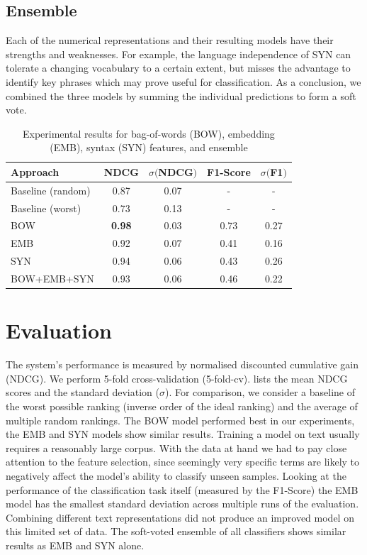 \subsection{Ensemble}
Each of the numerical representations and their resulting models have their strengths and weaknesses.
For example, the language independence of SYN can tolerate a changing vocabulary to a certain extent, but misses the advantage to identify key phrases which may prove useful for classification.
As a conclusion, we combined the three models by summing the individual predictions to form a soft vote.
\begin{table}[tb]
	\caption{Experimental results for bag-of-words (BOW), embedding (EMB), syntax (SYN) features, and ensemble}
	\label{tab:results}
	\begin{tabular}{lcccc}
		\toprule
		Approach & NDCG & $\sigma ($NDCG$)$ & F1-Score &  $\sigma ($F1$)$\\
		\midrule
		Baseline (random) & 0.87 & 0.07 & - & - \\
		Baseline (worst)  & 0.73 & 0.13 & - & - \\
		\midrule
		BOW & \textbf{0.98} & 0.03 & 0.73 & 0.27\\
		EMB & 0.92 & 0.07 & 0.41 & 0.16\\
		SYN & 0.94 & 0.06 & 0.43 & 0.26 \\
		BOW+EMB+SYN& 0.93 & 0.06 & 0.46 & 0.22\\
		\bottomrule
	\end{tabular}
\end{table}
\vfill\null
\section{Evaluation}



The system's performance is measured by normalised discounted cumulative gain (NDCG)\cite{ir}.
We perform 5-fold cross-validation (5-fold-cv).
 lists the mean NDCG scores and the standard deviation ($\sigma$).
For comparison, we consider a baseline of the worst possible ranking (inverse order of the ideal ranking) and the average of multiple random rankings.
The BOW model performed best in our experiments, the EMB and SYN models show similar results. 
Training a model on text usually requires a reasonably large corpus.
With the data at hand we had to pay close attention to the feature selection, since seemingly very specific terms are likely to negatively affect the model's ability to classify unseen samples.
Looking at the performance of the classification task itself (measured by the F1-Score) the EMB model has the smallest standard deviation across multiple runs of the evaluation.
Combining different text representations did not produce an improved model on this limited set of data.
The soft-voted ensemble of all classifiers shows similar results as EMB and SYN alone.

